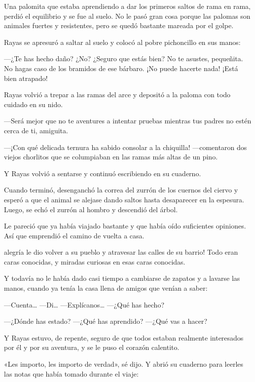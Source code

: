 \documentclass{barcodevapor3pags}
\begin{document}

Una palomita que estaba aprendiendo a dar los primeros saltos de rama en
rama, perdió el equilibrio y se fue al suelo. No le pasó gran cosa
porque las palomas son animales fuertes y resistentes, pero se quedó
bastante mareada por el golpe.

Rayas se apresuró a saltar al suelo y colocó al pobre pichoncillo en sus
manos:

---¿Te has hecho daño? ¿No? ¿Seguro que estás bien? No te asustes,
pequeñita. No hagas caso de los bramidos de ese bárbaro. ¡No puede
hacerte nada! ¡Está bien atrapado!

Rayas volvió a trepar a las ramas del arce y depositó a la paloma con
todo cuidado en su nido.

---Será mejor que no te aventures a intentar pruebas mientras tus padres
no estén cerca de ti, amiguita.

---¡Con qué delicada ternura ha sabido consolar a la chiquilla!
---comentaron dos viejos chorlitos que se columpiaban en las ramas más
altas de un pino.

Y Rayas volvió a sentarse y continuó escribiendo en su cuaderno.

Cuando terminó, desenganchó la correa del zurrón de los cuernos del
ciervo y esperó a que el animal se alejase dando saltos hasta
desaparecer en la espesura. Luego, se echó el zurrón al hombro y
descendió del árbol.

Le pareció que ya había viajado bastante y que había oído suficientes
opiniones. Así que emprendió el camino de vuelta a casa.

\capitulo

 alegría le dio volver a su pueblo y atravesar las calles de su
barrio! Todo eran caras conocidas, y miradas curiosas en esas caras conocidas.

Y todavía no le había dado casi tiempo a cambiarse de zapatos y a
lavarse las manos, cuando ya tenía la casa llena de amigos que venían a
saber:

---Cuenta\ldots{} ---Di\ldots{} 
---Explícanos\ldots{} ---¿Qué has hecho?

---¿Dónde has estado? ---¿Qué has aprendido? 
---¿Qué vas a hacer?

Y Rayas estuvo, de repente, seguro de que todos estaban realmente
interesados por él y por su aventura, y se le puso el corazón calentito.

«Les importo, les importo de verdad», sé dijo. Y abrió su cuaderno para
leerles las notas que había tomado durante el viaje:
\end{document}
